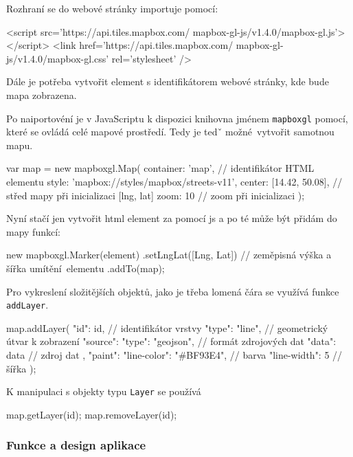 \bigbreak

Rozhraní se do webové stránky importuje pomocí:
\begin{code}[frame=none]
<script src='https://api.tiles.mapbox.com/
	mapbox-gl-js/v1.4.0/mapbox-gl.js'></script>
<link href='https://api.tiles.mapbox.com/
	mapbox-gl-js/v1.4.0/mapbox-gl.css' rel='stylesheet' />
\end{code}

\bigbreak

Dále je potřeba vytvořit element s identifikátorem webové stránky, kde bude mapa zobrazena.

\bigbreak

Po naiportovéní je v JavaScriptu k dispozici knihovna jménem \verb-mapboxgl- pomocí, které se ovládá celé mapové prostředí. Tedy je tedˇ možné vytvořit samotnou mapu.
\begin{code}[frame=none]
var map = new mapboxgl.Map({
	container: 'map', // identifikátor HTML elementu
	style: 'mapbox://styles/mapbox/streets-v11',
	center: [14.42, 50.08], // střed mapy při
		inicializaci [lng, lat]
	zoom: 10 // zoom při inicializaci
});
\end{code}

\bigbreak

Nyní stačí jen vytvořit \gls{html} element za pomocí \gls{js} a po té může být přidám do mapy funkcí:
\begin{code}[frame=none]
new mapboxgl.Marker(element)
	.setLngLat([Lng, Lat]) // zeměpisná výška a šířka
		umítění elementu
	.addTo(map);
\end{code}

\bigbreak

Pro vykreslení složitějších objektů, jako je třeba lomená čára se využívá funkce \verb-addLayer-.
\begin{code}[frame=none]
map.addLayer({
	"id": id, // identifikátor vrstvy
	"type": "line", // geometrický útvar k zobrazení
	"source": {
		"type": "geojson", // formát zdrojových dat
		"data": data // zdroj dat
	},
	"paint": {
		"line-color": "#BF93E4", // barva
		"line-width": 5 // šířka
	}
});
\end{code}

\bigbreak

K manipulaci s objekty typu \verb-Layer- se používá
\begin{code}[frame=none]
map.getLayer(id);
map.removeLayer(id);
\end{code}

\subsubsection{Funkce a design aplikace}

